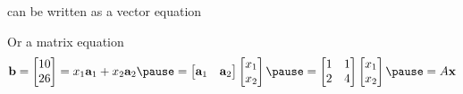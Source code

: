 \documentclass{beamer}
\theoremstyle{definition}
\theoremstyle{remark}
\begin{document}
\begin{frame}[t]
\begin{example}
 can be written as a vector equation
\begin{center}
\scalebox{0.9}{
$\mathbf b=\begin{bmatrix}
10\\26
\end{bmatrix}\pause=\begin{bmatrix}
x_1+x_2\\2x_1+4x_2
\end{bmatrix}\pause=\begin{bmatrix}
x_1\\2x_1
\end{bmatrix}+\begin{bmatrix}
x_2\\4x_2
\end{bmatrix}\pause=x_1\begin{bmatrix}
1\\2
\end{bmatrix}+x_2\begin{bmatrix}
1\\4
\end{bmatrix}\pause=x_1\mathbf a_1+x_2\mathbf a_2$
}
\end{center}\pause
Or a matrix equation
\[
\mathbf b=\begin{bmatrix}
10\\26
\end{bmatrix}=x_1\mathbf a_1+x_2\mathbf a_2\pause=\begin{bmatrix}
\mathbf a_1&\mathbf a_2
\end{bmatrix}\begin{bmatrix}
x_1\\x_2
\end{bmatrix}\pause=\begin{bmatrix}
1&1\\2&4
\end{bmatrix}\begin{bmatrix}
x_1\\x_2
\end{bmatrix}\pause=A\mathbf x
\]
\end{example}
\end{frame}
\end{document}
